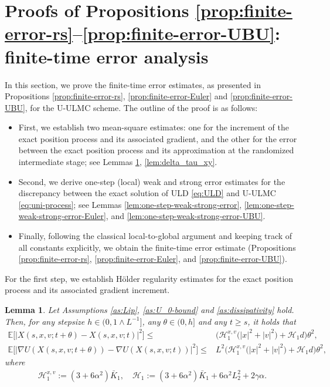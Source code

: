 \documentclass[12pt]{article}
\numberwithin{equation}{section}
\newtheorem{lem}{Lemma}[section]
\begin{document}
\section{Proofs of Propositions \ref{prop:finite-error-rs}--\ref{prop:finite-error-UBU}: finite-time error analysis}
\label{sec:pf-finite-error}
In this section, we prove the finite-time error estimates, as presented in Propositions \ref{prop:finite-error-rs}, \ref{prop:finite-error-Euler} and \ref{prop:finite-error-UBU}, for the U-ULMC scheme. 
The outline of the proof is as follows:
\begin{itemize}
    \item First, we establish two mean-square estimates: one for the increment of the exact position process and its associated gradient, and the other for the error between the exact position process and its approximation at the randomized intermediate stage; see Lemmas \ref{lem:xt-2p}, \ref{lem:delta_tau_xy}.
    \item Second, we derive one-step (local) weak and strong error estimates for the discrepancy between the exact solution of ULD \eqref{eq:ULD} and U-ULMC \eqref{eq:uni-process}; see Lemmas \ref{lem:one-step-weak-strong-error}, \ref{lem:one-step-weak-strong-error-Euler}, and \ref{lem:one-step-weak-strong-error-UBU}.
    \item Finally, following the classical local-to-global argument and keeping track of all constants explicitly, we obtain the finite-time error estimate (Propositions \ref{prop:finite-error-rs}, \ref{prop:finite-error-Euler}, and \ref{prop:finite-error-UBU}).
\end{itemize}

For the first step, we establish H\"older regularity estimates for the exact position process and its associated gradient increment.

\begin{lem}\label{lem:xt-2p}
Let Assumptions \ref{as:Lip}, \ref{as:U_0-bound} and \ref{as:dissipativity} hold.
%
%
Then, for any stepsize $h\in(0,1\wedge L^{-1}]$, any $\theta\in(0,h]$ and any $t\geq s$, it holds that
\begin{equation}
\begin{aligned}
\mathbb{E}
\Big[
\big|
X(s,x,v;t+\theta) -
X(s,x,v;t)
\big|^{2}
\Big] 
\leq   &
\Big(
\mathscr H^{x,v}_1
\big(
|x |^2 
+
|v |^2
\big)
+
\mathscr H_1
d
\Big)
\theta^2,
\\
\mathbb{E}
\Big[
\big|
\nabla U 
( X(s,x,v;t+\theta))
-
\nabla U
( X(s,x,v;t) )
\big|^{2}
\Big] 
\leq   & 
L^2
\Big(
\mathscr H^{x,v}_1
\big(
|x |^2 
+
|v |^2
\big)
+
\mathscr H_1
d
\Big)
\theta^2,
\end{aligned}
\end{equation}
where
\begin{equation}
\begin{aligned}
\mathscr H^{x,v}_1
:=  
(3+6\alpha^2)\bar K_1
,
\quad
\mathscr H_1
:=  
(3+6\alpha^2)\bar K_1
+
6\alpha^2L_2^2
+
2\gamma\alpha.
\end{aligned}
\end{equation}
\end{lem}
\end{document}
